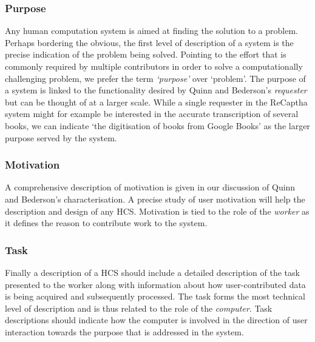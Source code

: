 \subsubsection{Purpose}

Any human computation system is aimed at finding the solution to a problem. Perhaps bordering the obvious, the first level of description of a system is the precise indication of the problem being solved. Pointing to the effort that is commonly required by multiple contributors in order to solve a computationally challenging problem, we prefer the term \emph{`purpose'} over `problem'. The purpose of a system is linked to the functionality desired by Quinn and Bederson's \emph{requester} but can be thought of at a larger scale. While a single requester in the ReCaptha system might for example be interested in the accurate transcription of several books, we can indicate `the digitisation of books from Google Books' as the larger purpose served by the system.

\subsubsection{Motivation}

A comprehensive description of motivation is given in our discussion of Quinn and Bederson's characterisation. A precise study of user motivation will help the description and design of any HCS. Motivation is tied to the role of the \emph{worker} as it defines the reason to contribute work to the system.

\subsubsection{Task}

Finally a description of a HCS should include a detailed description of the task presented to the worker along with information about how user-contributed data is being acquired and subsequently processed. The task forms the most technical level of description and is thus related to the role of the \emph{computer}. Task descriptions should indicate how the computer is involved in the direction of user interaction towards the purpose that is addressed in the system.







